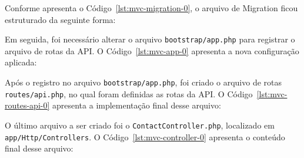         

        \par Conforme apresenta o Código~\ref{lst:mvc-migration-0}, o arquivo de Migration ficou estruturado da seguinte forma:

        

        \par Em seguida, foi necessário alterar o arquivo \texttt{bootstrap/app.php} para registrar o arquivo de rotas da API. O Código~\ref{lst:mvc-app-0} apresenta a nova configuração aplicada:
        
        

        \par Após o registro no arquivo \texttt{bootstrap/app.php}, foi criado o arquivo de rotas \texttt{routes/api.php}, no qual foram definidas as rotas da API. O Código~\ref{lst:mvc-routes-api-0} apresenta a implementação final desse arquivo:
        
        

        \sloppy

        \par O último arquivo a ser criado foi o \texttt{ContactController.php}, localizado em \texttt{app/Http/Controllers}. O Código~\ref{lst:mvc-controller-0} apresenta o conteúdo final desse arquivo:

        \vspace{1cm}
        

